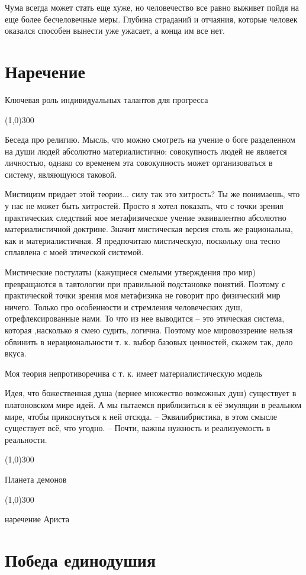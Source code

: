 \documentclass[12pt,a4paper]{article}
\newcommand{\sep}{
	\begin{center}
		\line(1,0){300}
	\end{center}
}
\begin{document}
Чума всегда может стать еще хуже, но человечество все равно выживет пойдя на еще более бесчеловечные меры. Глубина страданий и отчаяния, которые человек оказался способен вынести уже ужасает, а конца им все нет.

\section*{Наречение}
Ключевая роль индивидуальных талантов для прогресса

\sep

Беседа про религию. Мысль, что можно смотреть на учение о боге разделенном на души людей абсолютно материалистично: совокупность людей не является личностью, однако со временем эта совокупность может организоваться в систему, являющуюся таковой.

Мистицизм придает этой теории... силу
так это хитрость?
Ты же понимаешь, что у нас не может быть хитростей. Просто я хотел показать, что с точки зрения практических следствий мое метафизическое учение эквивалентно абсолютно материалистичной доктрине. Значит мистическая версия столь же рациональна, как и материалистичная. Я предпочитаю мистическую, поскольку она тесно сплавлена с моей этической системой.

Мистические постулаты (кажущиеся смелыми утверждения про мир) превращаются в тавтологии при правильной подстановке понятий. Поэтому с практической точки зрения моя метафизика не говорит про физический мир ничего. Только про особенности и стремления человеческих душ, отрефлексированные нами. То что из нее выводится -- это этическая система, которая ,насколько я смею судить, логична. Поэтому мое мировоззрение нельзя обвинить в нерациональности т. к. выбор базовых ценностей, скажем так, дело вкуса.

Моя теория непротиворечива с т. к. имеет материалистическую модель

Идея, что божественная душа (вернее множество возможных душ) существует в платоновском мире идей. А мы пытаемся приблизиться к её эмуляции в реальном мире, чтобы прикоснуться к ней отсюда. -- Эквилибристика, в этом смысле существует всё, что угодно. -- Почти, важны нужность и реализуемость в реальности.


\sep

Планета демонов

\sep

наречение Ариста

\section*{Победа единодушия}
\end{document}
